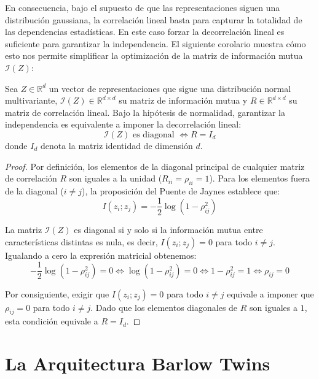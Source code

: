 En consecuencia, bajo el supuesto de que las representaciones siguen una distribución gaussiana, la correlación lineal basta para capturar la totalidad de las dependencias estadísticas. En este caso forzar la decorrelación lineal es suficiente para garantizar la independencia. El siguiente corolario muestra cómo esto nos permite simplificar la optimización de la matriz de información mutua $\mathcal{I}(Z)$:

\begin{corollary}
Sea $Z \in \mathbb{R}^d$ un vector de representaciones que sigue una distribución normal multivariante, $\mathcal{I}(Z) \in \mathbb{R}^{d \times d}$ su matriz de información mutua y $R \in \mathbb{R}^{d \times d}$ su matriz de correlación lineal. Bajo la hipótesis de normalidad, garantizar la independencia es equivalente a imponer la decorrelación lineal:
\begin{equation}
\mathcal{I}(Z) \text{ es diagonal } \iff R = I_d
\end{equation}
donde $I_d$ denota la matriz identidad de dimensión $d$.
\end{corollary}

\begin{proof}
Por definición, los elementos de la diagonal principal de cualquier matriz de correlación $R$ son iguales a la unidad ($R_{ii} = \rho_{ii} = 1$). Para los elementos fuera de la diagonal ($i \neq j$), la proposición del Puente de Jaynes establece que:
\begin{equation}
I(z_i; z_j) = -\frac{1}{2} \log(1 - \rho_{ij}^2)
\end{equation}

La matriz $\mathcal{I}(Z)$ es diagonal si y solo si la información mutua entre características distintas es nula, es decir, $I(z_i; z_j) = 0$ para todo $i \neq j$. Igualando a cero la expresión matricial obtenemos:
\begin{equation}
-\frac{1}{2} \log(1 - \rho_{ij}^2) = 0 \iff \log(1 - \rho_{ij}^2) = 0 \iff 1 - \rho_{ij}^2 = 1 \iff \rho_{ij} = 0
\end{equation}

Por consiguiente, exigir que $I(z_i; z_j) = 0$ para todo $i \neq j$ equivale a imponer que $\rho_{ij} = 0$ para todo $i \neq j$. Dado que los elementos diagonales de $R$ son iguales a $1$, esta condición equivale a $R = I_d$.
\end{proof}

\section{La Arquitectura Barlow Twins}
\label{sec:barlow_twins}

